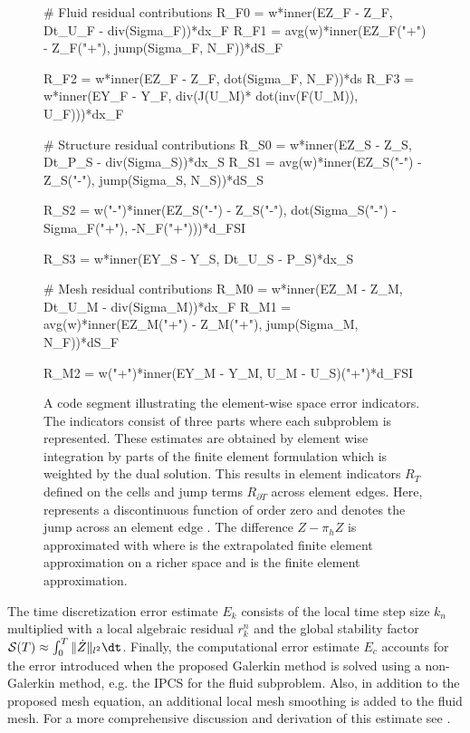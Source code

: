 \begin{figure}
\begin{python}
# Fluid residual contributions
R_F0 = w*inner(EZ_F - Z_F, Dt_U_F - div(Sigma_F))*dx_F
R_F1 = avg(w)*inner(EZ_F("+") - Z_F("+"),
              jump(Sigma_F, N_F))*dS_F

R_F2 = w*inner(EZ_F - Z_F, dot(Sigma_F, N_F))*ds
R_F3 = w*inner(EY_F - Y_F, div(J(U_M)*
         dot(inv(F(U_M)), U_F)))*dx_F

# Structure residual contributions
R_S0 = w*inner(EZ_S - Z_S, Dt_P_S - div(Sigma_S))*dx_S
R_S1 = avg(w)*inner(EZ_S("-") - Z_S("-"),
             jump(Sigma_S, N_S))*dS_S

R_S2 = w("-")*inner(EZ_S("-") - Z_S("-"),
             dot(Sigma_S("-") - Sigma_F("+"),
             -N_F("+")))*d_FSI

R_S3 = w*inner(EY_S - Y_S, Dt_U_S - P_S)*dx_S

# Mesh residual contributions
R_M0 = w*inner(EZ_M - Z_M, Dt_U_M - div(Sigma_M))*dx_F
R_M1 = avg(w)*inner(EZ_M("+") - Z_M("+"),
              jump(Sigma_M, N_F))*dS_F

R_M2 = w("+")*inner(EY_M - Y_M, U_M - U_S)("+")*d_FSI
\end{python}
\caption{A code segment illustrating the element-wise space error
  indicators. The indicators consist of three parts where each
  subproblem is represented. These estimates are obtained by element
  wise integration by parts of the finite element formulation which is
  weighted by the dual solution. This results in element indicators
  $R_T$ defined on the cells and jump terms $R_{\partial T}$ across
  element edges. Here,  represents a discontinuous function of
  order zero and  denotes the jump across an element edge
  . The difference $Z -\pi_h Z$ is approximated with  where  is the extrapolated finite element approximation
  on a richer space and  is the finite element approximation.}
\label{selim:fig:strong_residuals}
\end{figure}
The time discretization error estimate $E_k$ consists of the local time
step size $k_n$ multiplied with a local algebraic residual
$r_k^n$ and the global stability factor $\mathcal{S}(T) \approx
\int_0^T \| \dot{Z} \|_{l^2}\dt$. Finally, the computational error
estimate $E_c$ accounts for the error introduced when the proposed
Galerkin method is solved using a non-Galerkin method, e.g. the IPCS
for the fluid subproblem. Also, in addition to the proposed mesh
equation, an additional local mesh smoothing is added to the fluid
mesh.  For a more comprehensive discussion and derivation of this
\apost{} estimate see \citet{SelimLogg2011a}.

